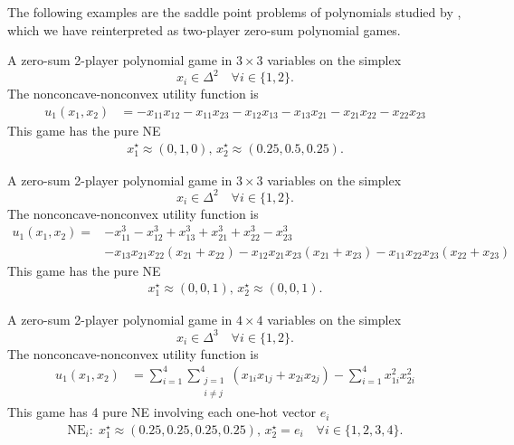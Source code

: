 The following examples are the saddle point problems of polynomials studied by \textcite{nie.yang.ea:saddle}, which we have reinterpreted as two-player zero-sum polynomial games.

\begin{game}\label{ex.nie21.6.1.i}

A zero-sum 2-player polynomial game in $3 \times 3$ variables on the simplex
\[
x_i \in \Delta^{2} \quad \forall i \in \{1,2\}.
\]
The nonconcave-nonconvex utility function \cite[Example~6.1 (i)]{nie.yang.ea:saddle} is
\begin{align*}
u_{1}\left( x_{1}, x_{2} \right) &=  - x_{11} x_{12} - x_{11} x_{23} - x_{12} x_{13} - x_{13} x_{21} - x_{21} x_{22} - x_{22} x_{23}
\end{align*}
This game has the pure NE
\begin{align*}
x_1^\star \approx (0,1,0),\, x_2^\star \approx (0.25,0.5,0.25).
\end{align*}
\end{game}

\begin{game}\label{ex.nie21.6.1.ii}

A zero-sum 2-player polynomial game in $3 \times 3$ variables on the simplex
\[
x_i \in \Delta^{2} \quad \forall i \in \{1,2\}.
\]
The nonconcave-nonconvex utility function \cite[Example~6.1 (ii)]{nie.yang.ea:saddle} is
\begin{align*}
u_1(x_1, x_2) = &-x_{11}^3 - x_{12}^3 + x_{13}^3 + x_{21}^3 + x_{22}^3 - x_{23}^3 \\
    &- x_{13}x_{21}x_{22}(x_{21} + x_{22}) - x_{12}x_{21}x_{23}(x_{21} + x_{23}) - x_{11}x_{22}x_{23}(x_{22} + x_{23})
\end{align*}
This game has the pure NE
\begin{align*}
x_1^\star \approx (0,0,1),\, x_2^\star \approx (0,0,1).
\end{align*}
\end{game}


\begin{game}\label{ex.nie21.6.1.iii}

A zero-sum 2-player polynomial game in $4 \times 4$ variables on the simplex
\[
x_i \in \Delta^{3} \quad \forall i \in \{1,2\}.
\]
The nonconcave-nonconvex utility function \cite[Example~6.1 (iii)]{nie.yang.ea:saddle} is
\begin{align*}
u_{1}\left( x_{1}, x_{2} \right) &= \sum_{i=1}^{4} \sum_{\substack{j=1 \\ i \ne j}}^{4} (x_{1i} x_{1j} + x_{2i} x_{2j})  - \sum_{i=1}^{4} x_{1i}^2 x_{2i}^2
\end{align*}
This game has 4 pure NE involving each one-hot vector $e_i$
\begin{align*}
\text{NE}_i:\;x_1^\star \approx (0.25,0.25,0.25,0.25),\, x_2^\star = e_i \quad \forall i \in \{1,2,3,4\}.
\end{align*}
\end{game}

